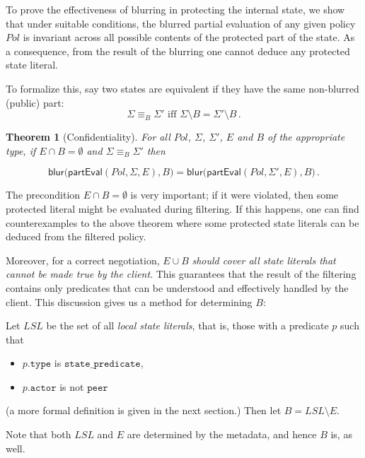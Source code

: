 \documentclass{article}
\newtheorem{theorem}{Theorem}
\newcommand{\m}[1]{\ensuremath{\mathsf{#1}}}
\newcommand{\s}[1]{\ensuremath{\mathtt{#1}}}
\newcommand{\x}[1]{\ensuremath{\mathit{#1}}}
\begin{document}
To prove the effectiveness of blurring in protecting the internal
state, we show that under suitable conditions, the blurred partial
evaluation of any given policy \x{Pol} is invariant across all
possible contents of the protected part of the state.  As a
consequence, from the result of the blurring one cannot deduce
any protected state literal.

To formalize this, say two states are equivalent if they have the same
non-blurred (public) part:
\[
        \Sigma \equiv_B \Sigma' \mbox{ iff }
        \Sigma \setminus B = \Sigma' \setminus B \,.
\]

\begin{theorem}[Confidentiality]
For all \x{Pol}, $\Sigma$, $\Sigma'$, $E$ and $B$ of the appropriate
type,  if $E \cap B=\emptyset$ and $\Sigma \equiv_B \Sigma'$ then
\end{theorem}
\[
   \m{blur(partEval}(\x{Pol},\Sigma,E),B) =
   \m{blur(partEval}(\x{Pol},\Sigma',E),B) \,.
\]

The precondition $E \cap B=\emptyset$ is very important; if it were
violated, then some protected literal might be evaluated during
filtering.  If this happens, one can find counterexamples to the above
theorem where some protected state literals can be deduced from the
filtered policy.

Moreover, for a correct negotiation, $E \cup B$ \emph{should cover all
state literals that cannot be made true by the client}. This
guarantees that the result of the filtering contains only predicates
that can be understood and effectively handled by the client.  This
discussion gives us a method for determining $B$:

Let \x{LSL} be the set of all \emph{local state literals}, that is,
those with a predicate $p$ such that
\begin{itemize}
\item $p.\s{type}$ is \s{state\_predicate},
\item $p.\s{actor}$ is not \s{peer}
\end{itemize}
(a more formal definition is given in the next section.)
Then let $B = \x{LSL} \setminus E$.

Note that both \x{LSL} and \x{E} are determined by the metadata, and
hence $B$ is, as well.
\end{document}
